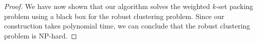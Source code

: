 \documentclass[times]{ettauth}
\newcommand{\ie}{i.e., }
\theoremstyle{mytheoremstyle}
\theoremstyle{mytheoremstyle}
\theoremstyle{mytheoremstyle}
\begin{document}
\begin{proof}
We have now shown that our algorithm solves the weighted $k$-set packing problem using a black box for the robust clustering problem. 
Since our construction takes polynomial time, we can conclude that the robust clustering problem is NP-hard.
%
%

\end{proof}
\end{document}
